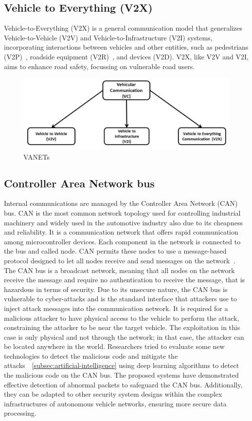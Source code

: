 \subsection{Vehicle to Everything (V2X)}\label{subsec:vehicle-to-everything-(v2x)}

Vehicle-to-Everything (V2X) is a general communication model that generalizes Vehicle-to-Vehicle (V2V) and Vehicle-to-Infrastructure (V2I) systems,
incorporating interactions between vehicles and other entities, such as pedestrians (V2P)~\cite{vehicle-to-pedestrian}, roadside equipment (V2R)~\cite{vehicle-to-roadside}, and devices (V2D).
V2X, like V2V and V2I, aims to enhance road safety, focussing on vulnerable road users.

\begin{figure}[!htb]
    \centering
    \includegraphics[width=0.7\linewidth]{figures/communication}
    \caption{VANETs}
    \label{fig:communication}
\end{figure}

\subsection{Controller Area Network bus}\label{subsec:canbus-communication}
Internal communications are managed by the Controller Area Network (CAN) bus.
CAN is the most common network topology
used for controlling industrial machinery
and widely used in the automotive industry also due to its cheapness and reliability.
It is a communication network that offers rapid communication among microcontroller
devices.
Each component in the network is connected to the bus and called node.
CAN permits these nodes to use a message-based protocol designed to
let all nodes receive and send messages on the network~\cite{canbus}.
The CAN bus is a broadcast network,
meaning that all nodes on the network receive the message and require no authentication to receive the message,
that is hazardous in terms of security.
Due to its unsecure nature,
the CAN bus is vulnerable to cyber-attacks and is the standard interface that attackers use to inject attack messages into the
communication network.
It is required for a malicious attacker to have physical access to the vehicle to perform the attack, constraining the attacker to be near the target vehicle.
The exploitation in this case is only physical and not through the network;
in that case, the attacker can be located anywhere in the world.
Researchers tried
to evaluate some new technologies to detect the malicious code
and mitigate the attacks~\cite{aldhyani2022attacks}~\ref{subsec:artificial-intelligence}
using deep learning algorithms to detect the malicious code on the CAN bus.
The proposed systems have demonstrated effective detection of abnormal packets to safeguard the CAN bus.
Additionally,
they can be adapted to other security system designs within the complex infrastructures of autonomous vehicle networks,
ensuring more secure data processing.
